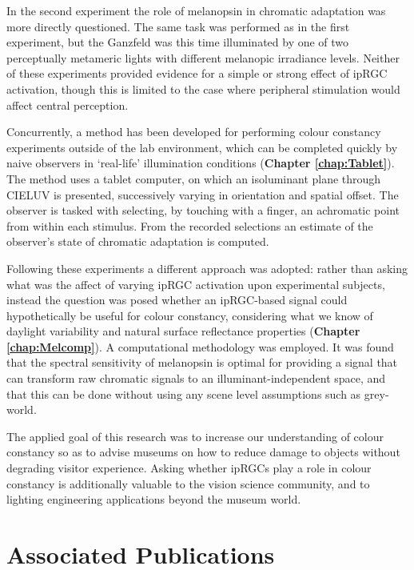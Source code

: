 In the second experiment the role of melanopsin in chromatic adaptation was more directly questioned. The same task was performed as in the first experiment, but the Ganzfeld was this time illuminated by one of two perceptually metameric lights with different melanopic irradiance levels. Neither of these experiments provided evidence for a simple or strong effect of ipRGC activation, though this is limited to the case where peripheral stimulation would affect central perception.

Concurrently, a method has been developed for performing colour constancy experiments outside of the lab environment, which can be completed quickly by naive observers in `real-life' illumination conditions (\textbf{Chapter \ref{chap:Tablet}}). The method uses a tablet computer, on which an isoluminant plane through CIELUV is presented, successively varying in orientation and spatial offset. The observer is tasked with selecting, by touching with a finger, an achromatic point from within each stimulus. From the recorded selections an estimate of the observer's state of chromatic adaptation is computed.

Following these experiments a different approach was adopted: rather than asking what was the affect of varying \gls{ipRGC} activation upon experimental subjects, instead the question was posed whether an \gls{ipRGC}-based signal could hypothetically be useful for colour constancy, considering what we know of daylight variability and natural surface reflectance properties (\textbf{Chapter \ref{chap:Melcomp}}). A computational methodology was employed. It was found that the spectral sensitivity of melanopsin is optimal for providing a signal that can transform raw chromatic signals to an illuminant-independent space, and that this can be done without using any scene level assumptions such as grey-world.

The applied goal of this research was to increase our understanding of colour constancy so as to advise museums on how to reduce damage to objects without degrading visitor experience. Asking whether \glspl{ipRGC} play a role in colour constancy is additionally valuable to the vision science community, and to lighting engineering applications beyond the museum world.

\section{Associated Publications}

